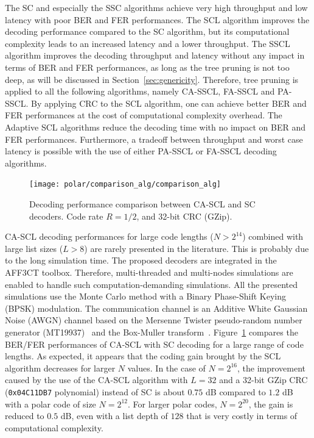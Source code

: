 The SC and especially the SSC algorithms achieve very high throughput and low
latency with poor BER and FER performances. The SCL algorithm improves the
decoding performance compared to the SC algorithm, but its computational
complexity leads to an increased latency and a lower throughput. The SSCL
algorithm improves the decoding throughput and latency without any impact in
terms of BER and FER performances, as long as the tree pruning is not too deep,
as will be discussed in Section~\ref{sec:genericity}. Therefore, tree pruning is
applied to all the following algorithms, namely CA-SSCL, FA-SSCL and PA-SSCL. By
applying CRC to the SCL algorithm, one can achieve better BER and FER
performances at the cost of computational complexity overhead. The Adaptive SCL
algorithms reduce the decoding time with no impact on BER and FER performances.
Furthermore, a tradeoff between throughput and worst case latency is possible
with the use of either PA-SSCL or FA-SSCL decoding algorithms.

\begin{figure}[t]
  \centering
  \texttt{[image: polar/comparison\_alg/comparison\_alg]}
  \caption{Decoding performance comparison between CA-SCL and SC decoders.
    Code rate $R = 1/2$, and 32-bit CRC (GZip).}
  \label{plot:polar_comparison_alg}
\end{figure}

CA-SCL decoding performances for large code lengths ($N > 2^{14}$) combined with
large list sizes ($L > 8$) are rarely presented in the literature. This is
probably due to the long simulation time. The proposed decoders are integrated
in the AFF3CT toolbox. Therefore, multi-threaded and multi-nodes simulations
are enabled to handle such computation-demanding simulations. All the presented
simulations use the Monte Carlo method with a Binary Phase-Shift Keying (BPSK)
modulation. The communication channel is an Additive White Gaussian Noise (AWGN)
channel based on the Mersenne Twister pseudo-random number generator
(MT19937)~\cite{Matsumoto1998} and the Box-Muller transform~\cite{Box1958}.
Figure~\ref{plot:polar_comparison_alg} compares the BER/FER performances of
CA-SCL with SC decoding for a large range of code lengths. As expected, it
appears that the coding gain brought by the SCL algorithm decreases for larger
$N$ values. In the case of $N=2^{16}$, the improvement caused by the use of the
CA-SCL algorithm with $L=32$ and a 32-bit GZip CRC (\texttt{0x04C11DB7}
polynomial) instead of SC is about $0.75$ dB compared to $1.2$ dB with a polar
code of size $N=2^{12}$. For larger polar codes, $N=2^{20}$, the gain is reduced
to $0.5$ dB, even with a list depth of $128$ that is very costly in terms of
computational complexity.

